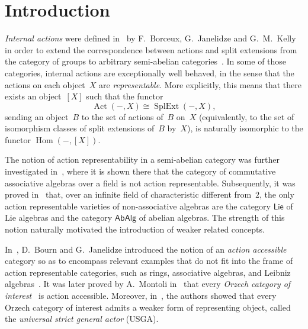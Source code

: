 \documentclass[reqno,hidelinks,a4paper]{amsart}
\theoremstyle{plain}
\theoremstyle{definition}
\theoremstyle{remark}
\numberwithin{equation}{section}
\DeclareMathOperator{\Act}{Act}
\DeclareMathOperator{\Hom}{Hom}
\DeclareMathOperator{\SplExt}{SplExt}
\newcommand{\Lie}{\ensuremath{\mathsf{Lie}}}
\newcommand{\AbAlg}{\ensuremath{\mathsf{AbAlg}}}
\begin{document}

\maketitle

\section*{Introduction}\label{Introduction}
\emph{Internal actions} were defined in~\cite{BJK} by F.~Borceux, G.~Janelidze and G.~M.~Kelly in order to extend the correspondence between actions and split extensions from the category of groups to arbitrary semi-abelian categories~\cite{Semi-Ab}. In some of those categories, internal actions are exceptionally well behaved, in the sense that the actions on each object~\(X\) are \emph{representable}. More explicitly, this means that there exists an object~\([X]\) such that the functor
\[
    \Act(-,X)\cong \SplExt(-,X),
\]
sending an object~\(B\) to the set of actions of~\(B\) on~\(X\) (equivalently, to the set of isomorphism classes of split extensions of~\(B\) by~\(X\)), is naturally isomorphic to the functor \(\Hom(-,[X])\).

The notion of action representability in a semi-abelian category was further investigated in~\cite{BJK2}, where it is shown there that the category of commutative associative algebras over a field is not action representable. Subsequently, it was proved in~\cite{Tim} that, over an infinite field of characteristic different from~\(2\), the only action representable varieties of non-associative algebras are the category \(\Lie\) of Lie algebras and the category \(\AbAlg\) of abelian algebras. The strength of this notion naturally motivated the introduction of weaker related concepts.

In~\cite{act_accessible}, D.~Bourn and G.~Janelidze introduced the notion of an \emph{action accessible} category so as to encompass relevant examples that do not fit into the frame of action representable categories, such as rings, associative algebras, and Leibniz algebras~\cite{loday}. It was later proved by A.~Montoli in~\cite{Montoli} that every \emph{Orzech category of interest}~\cite{Orzech} is action accessible. Moreover, in~\cite{Casas}, the authors showed that every Orzech category of interest admits a weaker form of representing object, called the \emph{universal strict general actor} (USGA).
\end{document}
